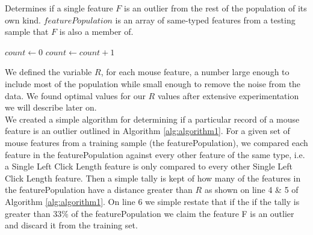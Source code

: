 \documentclass[conference]{IEEEtran}
\begin{document}
\begin{algorithm}

\caption{Determines if a single feature $F$ is an outlier from the rest of the population of its own kind. $featurePopulation$ is an array of same-typed features from a testing sample that $F$ is also a member of.}\label{euclid}
\begin{algorithmic}[1]
\State $\textit{count} \gets 0$
				\State $count \gets count + 1$
			\EndIf
	\EndFor

		\State {}
	\Else
		\State {} 

	\EndIf
\EndProcedure
\end{algorithmic}
\label{alg:algorithm1}

\end{algorithm}

We defined the variable $R$, for each mouse feature, a number large enough to include most of the population while small enough to remove the noise from the data. We found optimal values for our $R$ values after extensive experimentation we will describe later on.\\
We created a simple algorithm for determining if a particular record of a mouse feature is an outlier outlined in Algorithm \ref{alg:algorithm1}. For a given set of mouse features from a training sample (the featurePopulation), we compared each feature in the featurePopulation against every other feature of the same type, i.e. a Single Left Click Length feature is only compared to every other Single Left Click Length feature. Then a simple tally is kept of how many of the features in the featurePopulation have a distance greater than $R$ as shown on line 4 \& 5 of Algorithm \ref{alg:algorithm1}. On line 6 we simple restate that if the if the tally is greater than 33\% of the featurePopulation we claim the feature F is an outlier and discard it from the training set.
\end{document}
